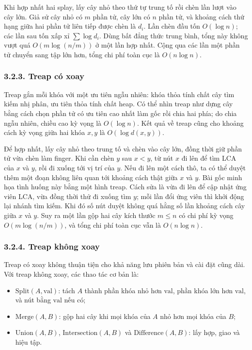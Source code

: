 \documentclass[11pt]{article}
\begin{document}
Khi hợp nhất hai splay, lấy cây nhỏ theo thứ tự trung tố rồi chèn lần lượt vào
cây lớn. Giả sử cây nhỏ có \(m\) phần tử, cây lớn có \(n\) phần tử, và khoảng
cách thứ hạng giữa hai phần tử liên tiếp được chèn là \(d_i\). Lần chèn đầu tốn
\(O(\log n)\); các lần sau tốn xấp xỉ \(\sum \log d_i\). Dùng bất đẳng thức
trung bình, tổng này không vượt quá \(O(m\log(n/m))\) ở một lần hợp nhất. Cộng
qua các lần một phần tử chuyển sang tập lớn hơn, tổng chi phí toàn cục là
\(O(n\log n)\).

\subsubsection*{3.2.3. Treap có xoay}

Treap gắn mỗi khóa với một ưu tiên ngẫu nhiên: khóa thỏa tính chất cây tìm kiếm
nhị phân, ưu tiên thỏa tính chất heap. Có thể nhìn treap như dựng cây bằng cách
chọn phần tử có ưu tiên cao nhất làm gốc rồi chia hai phía; do chia ngẫu nhiên,
chiều cao kỳ vọng là \(O(\log n)\). Kết quả về treap cũng cho khoảng cách kỳ
vọng giữa hai khóa \(x,y\) là \(O(\log d(x,y))\).

Để hợp nhất, lấy cây nhỏ theo trung tố và chèn vào cây lớn, đồng thời giữ phần
tử vừa chèn làm finger. Khi cần chèn \(y\) sau \(x<y\), từ nút \(x\) đi lên để
tìm LCA của \(x\) và \(y\), rồi đi xuống tới vị trí của \(y\). Nếu đi lên một
cách thô, ta có thể duyệt thêm một đoạn không liên quan tới khoảng cách thật
giữa \(x\) và \(y\). Bài gốc minh họa tình huống này bằng một hình treap. Cách
sửa là vừa đi lên để cập nhật ứng viên LCA, vừa đồng thời thử đi xuống tìm
\(y\); mỗi lần đổi ứng viên thì khởi động lại nhánh tìm kiếm. Khi đó số nút
duyệt không quá hằng số lần khoảng cách cây giữa \(x\) và \(y\). Suy ra một lần
gộp hai cây kích thước \(m\le n\) có chi phí kỳ vọng \(O(m\log(n/m))\), và tổng
chi phí toàn cục vẫn là \(O(n\log n)\).


\subsubsection*{3.2.4. Treap không xoay}

Treap có xoay không thuận tiện cho khả năng lưu phiên bản và cài đặt cũng dài.
Với treap không xoay, các thao tác cơ bản là:
\begin{itemize}
  \item \(\mathrm{Split}(A,\mathrm{val})\): tách \(A\) thành phần khóa nhỏ hơn
  \(\mathrm{val}\), phần khóa lớn hơn \(\mathrm{val}\), và nút bằng
  \(\mathrm{val}\) nếu có;
  \item \(\mathrm{Merge}(A,B)\): gộp hai cây khi mọi khóa của \(A\) nhỏ hơn mọi
  khóa của \(B\);
  \item \(\mathrm{Union}(A,B)\), \(\mathrm{Intersection}(A,B)\) và
  \(\mathrm{Difference}(A,B)\): lấy hợp, giao và hiệu tập.
\end{itemize}
\end{document}
